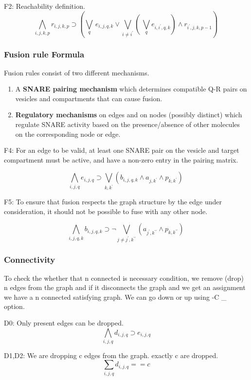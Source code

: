 F2: Reachability definition.
\[ \bigwedge\limits_{i,j,k,p} r_{i,j,k,p} \supset (\bigvee_{q} \, e_{i,j,q,k} \lor \bigvee_{i\neq i^{\prime}} ( \, \bigvee_{q} e_{i,i^{\prime},q,k}) \land r_{i^{\prime},j,k,p-1} ) \, \]


\subsubsection{ Fusion rule Formula}

Fusion rules consist of two different mechanisms.

\begin{enumerate}
\item  A \textbf{SNARE pairing mechanism} which determines compatible Q-R pairs on vesicles and compartments that can cause fusion.
\item \textbf{Regulatory mechanisms} on edges and on nodes (possibly distinct) which regulate SNARE activity based on the presence/absence of other molecules on the corresponding node or edge.
\end{enumerate}

F4: For an edge to be valid, at least one SNARE pair on the vesicle and target compartment must be active, and have a non-zero entry in the pairing matrix.  

\[ \bigwedge\limits_{i,j,q} e_{i,j,q} \supset \bigvee_{k,k^{\prime}} (b_{i,j,q,k} \land a_{j,k^{\prime}} \land p_{k,k^{\prime}}) \, \]

F5: To ensure that fusion respects the graph structure by the edge under consideration, it should not be possible to fuse with any other node.

\[ \bigwedge\limits_{i,j,q,k} b_{i,j,q,k} \supset \neg \bigvee_{j \neq j^{\prime}, k^{\prime\prime}} ( a_{j^{\prime},k^{\prime\prime}} \land p_{k,k^{\prime\prime}}) \, \]


\subsubsection{Connectivity}
To check the whether that n connected is necessary condition, we remove (drop) n edges from the graph and if it disconnects the graph and we get an assignment we have a n connected satisfying graph. We can go down or up using -C \_ option.  \newline 

D0: Only present edges can be dropped.
\[ \bigwedge\limits_{i,j,q} d_{i,j,q} \supset e_{i,j,q}  \]

D1,D2: We are dropping c edges from the graph. exactly c are dropped.
\[ \sum_{i,j,q} d_{i,j,q} == c \]

